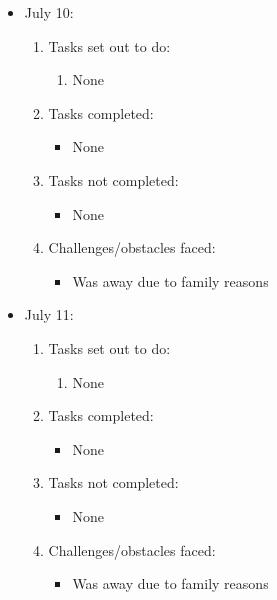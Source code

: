 	\begin{itemize}
		\item July 10:
		\begin{enumerate}
			\item Tasks set out to do:
			\begin{enumerate}
				\item None
			\end{enumerate}
			\item Tasks completed:
			\begin{itemize}
				\item None
			\end{itemize}
			\item Tasks not completed:
			\begin{itemize}
				\item None
			\end{itemize}
			\item Challenges/obstacles faced:
			\begin{itemize}
				\item Was away due to family reasons
			\end{itemize}			
		\end{enumerate}
	\end{itemize}
	
	\begin{itemize}
		\item July 11:
		\begin{enumerate}
			\item Tasks set out to do:
			\begin{enumerate}
				\item None
			\end{enumerate}
			\item Tasks completed:
			\begin{itemize}
				\item None
			\end{itemize}
			\item Tasks not completed:
			\begin{itemize}
				\item None
			\end{itemize}
			\item Challenges/obstacles faced:
			\begin{itemize}
				\item Was away due to family reasons
			\end{itemize}			
		\end{enumerate}
	\end{itemize}
	
